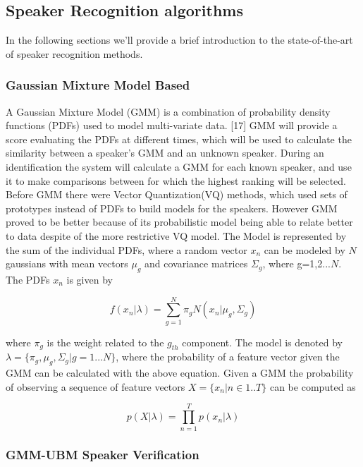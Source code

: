 \subsection{Speaker Recognition algorithms}

In the following sections we'll provide a brief introduction
to the state-of-the-art of speaker recognition methods.

\subsubsection{Gaussian Mixture Model Based}

A Gaussian Mixture Model (GMM) is a combination of probability
density functions (PDFs) used to model multi-variate data. [17]
GMM will provide a score evaluating the PDFs at different times, which
will be used to calculate the similarity between a speaker's GMM and an
unknown speaker. During an identification the system will calculate
a GMM for each known speaker, and use it to make comparisons between
for which the highest ranking will be selected.\\
Before GMM there were Vector Quantization(VQ) methods, which used
sets of prototypes instead of PDFs to build models for the speakers.
However GMM proved to be better because of its probabilistic model being
able to relate better to data despite of the more restrictive VQ model.
The Model is represented by the sum of the individual PDFs, where a random
vector $x_{n}$ can be modeled by $N$ gaussians with mean vectors $\mu_{g}$ and
covariance matrices $\Sigma_{g}$, where g=1,2...$N$. The PDFs $x_{n}$ is given by

\begin{equation}
    f(x_{n}|\lambda) = {\sum_{g=1}^N \pi_{g}N(x_{n}| \mu_{g}, \Sigma_{g})}
\end{equation}

where $\pi_{g}$ is the weight related to the $g_{th}$ component. The model
is denoted by $\lambda = \{ \pi_{g}, \mu_{g},\Sigma_{g}| g=1...N\}$, where the
probability of a feature vector given the GMM can be calculated with the above equation.
Given a GMM the probability of observing a sequence of feature vectors $X=\{x_{n}| n \in 1..T\}$
can be computed as

\begin{equation}
    p(X | \lambda) = {\prod_{n=1}^Tp(x_{n}| \lambda)}
\end{equation}


\subsubsection{GMM-UBM Speaker Verification}

